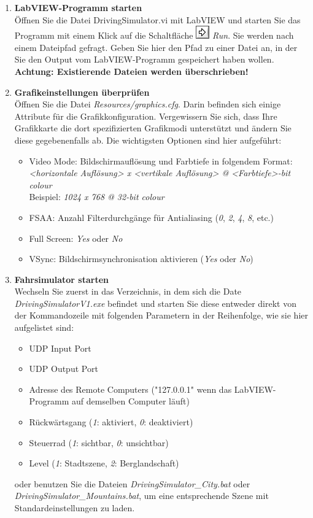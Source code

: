 \begin{enumerate}[label=\arabic*.]

\item \textbf{LabVIEW-Programm starten}\\
Öffnen Sie die Datei DrivingSimulator.vi mit LabVIEW und starten Sie das Programm mit einem Klick auf die Schaltfläche \includegraphics[height=\ht\strutbox]{src/icon_labview_run.png} \textit{Run}. Sie werden nach einem Dateipfad gefragt. Geben Sie hier den Pfad zu einer Datei an, in der Sie den Output vom LabVIEW-Programm gespeichert haben wollen. \textbf{Achtung: Existierende Dateien werden überschrieben!}

\item \textbf{Grafikeinstellungen überprüfen}\\
Öffnen Sie die Datei \textit{Resources/graphics.cfg}. Darin befinden sich einige Attribute für die Grafikkonfiguration. Vergewissern Sie sich, dass Ihre Grafikkarte die dort spezifizierten Grafikmodi unterstützt und ändern Sie diese gegebenenfalls ab. Die wichtigsten Optionen sind hier aufgeführt:
\begin{itemize}
	\item Video Mode: Bildschirmauflösung und Farbtiefe in folgendem Format: \textit{<horizontale Auflösung> x <vertikale Auflösung> @ <Farbtiefe>-bit colour}\\Beispiel: \textit{1024 x 768 @ 32-bit colour}
	\item FSAA: Anzahl Filterdurchgänge für Antialiasing (\textit{0}, \textit{2}, \textit{4}, \textit{8}, etc.)
	\item Full Screen: \textit{Yes} oder \textit{No}
	\item VSync: Bildschirmsynchronisation aktivieren (\textit{Yes} oder \textit{No})
\end{itemize}

\item \textbf{Fahrsimulator starten}\\
Wechseln Sie zuerst in das Verzeichnis, in dem sich die Date \textit{DrivingSimulatorV1.exe} befindet und starten Sie diese entweder direkt von der Kommandozeile mit folgenden Parametern in der Reihenfolge, wie sie hier aufgelistet sind:
\begin{itemize}
	\item UDP Input Port
	\item UDP Output Port
	\item Adresse des Remote Computers ("127.0.0.1" wenn das LabVIEW-Programm auf demselben Computer läuft)
	\item Rückwärtsgang (\textit{1}: aktiviert, \textit{0}: deaktiviert) 
	\item Steuerrad (\textit{1}: sichtbar, \textit{0}: unsichtbar)
	\item Level (\textit{1}: Stadtszene, \textit{2}: Berglandschaft)
\end{itemize}
oder benutzen Sie die Dateien \textit{DrivingSimulator\_City.bat} oder\\
\textit{DrivingSimulator\_Mountains.bat}, um eine entsprechende Szene mit Standardeinstellungen zu laden.


\end{enumerate}
